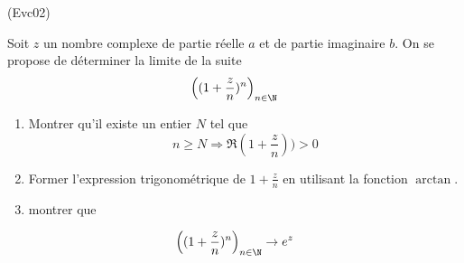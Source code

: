 \begin{tiny}(Evc02)\end{tiny}
Soit $z$ un nombre complexe de partie réelle $a$ et de partie imaginaire $b$. On se propose de déterminer la limite de la suite
\begin{displaymath}
 \left( (1+\dfrac{z}{n})^n\right)_{n\in \N}
\end{displaymath}
\begin{enumerate}
 \item Montrer qu'il existe un entier $N$ tel que 
\begin{displaymath}
  n \geq N \Rightarrow \Re(1+\dfrac{z}{n}))>0
\end{displaymath}
\item Former l'expression trigonométrique de $1+\frac{z}{n}$ en utilisant la fonction $\arctan$.
\item montrer que 
\end{enumerate}
\begin{displaymath}
 \left( (1+\dfrac{z}{n})^n\right)_{n\in \N}\rightarrow e^{z}
\end{displaymath}
